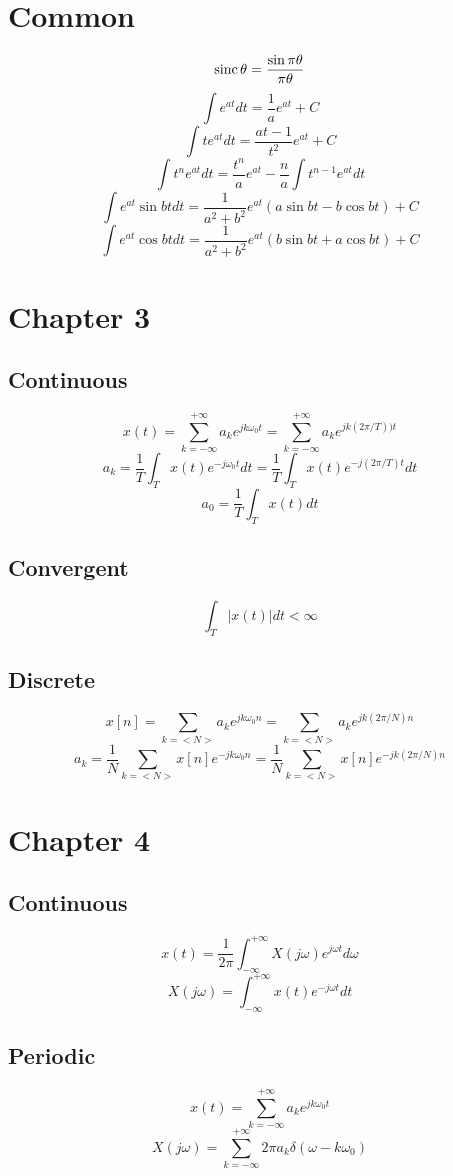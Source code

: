 \documentclass[landscape,a4paper]{article}
\begin{document}
\pagestyle{empty}

\begin{multicols}{3}
\footnotesize

\section*{Common}
$${\rm sinc\,}\theta=\frac{\sin\pi\theta}{\pi\theta}$$
$$\int e^{at}dt=\frac{1}{a}e^{at}+C$$
$$\int te^{at}dt=\frac{at-1}{t^2}e^{at}+C$$
$$\int t^ne^{at}dt=\frac{t^n}{a}e^{at}-\frac{n}{a}\int t^{n-1}e^{at}dt$$
$$\int e^{at}\sin btdt=\frac{1}{a^2+b^2}e^{at}(a\sin bt-b\cos bt)+C$$
$$\int e^{at}\cos btdt=\frac{1}{a^2+b^2}e^{at}(b\sin bt+a\cos bt)+C$$


\section*{Chapter 3}
\subsection*{Continuous}
$$x(t)=\sum_{k=-\infty}^{+\infty}a_ke^{jk\omega_0t}=\sum_{k=-\infty}^{+\infty}a_ke^{jk(2\pi/T))t}$$
$$a_k=\frac{1}{T}\int_Tx(t)e^{-j\omega_0t}dt=\frac{1}{T}\int_Tx(t)e^{-j(2\pi/T)t}dt$$
$$a_0=\frac{1}{T}\int_Tx(t)dt$$

\subsection*{Convergent}
$$\int_T|x(t)|dt<\infty$$

\subsection*{Discrete}
$$x[n]=\sum_{k=<N>}a_ke^{jk\omega_0n}=\sum_{k=<N>}a_ke^{jk(2\pi/N)n}$$
$$a_k=\frac{1}{N}\sum_{k=<N>}x[n]e^{-jk\omega_0n}=\frac{1}{N}\sum_{k=<N>}x[n]e^{-jk(2\pi/N)n}$$

\section*{Chapter 4}

\subsection*{Continuous}
$$x(t)=\frac{1}{2\pi}\int_{-\infty}^{+\infty}X(j\omega)e^{j\omega t}d\omega$$
$$X(j\omega)=\int_{-\infty}^{+\infty}x(t)e^{-j\omega t}dt$$

\subsection*{Periodic}
$$x(t)=\sum_{k=-\infty}^{+\infty}a_ke^{jk\omega_0t}$$
$$X(j\omega)=\sum_{k=-\infty}^{+\infty}2\pi a_k\delta(\omega-k\omega_0)$$


\end{multicols}
\end{document}
